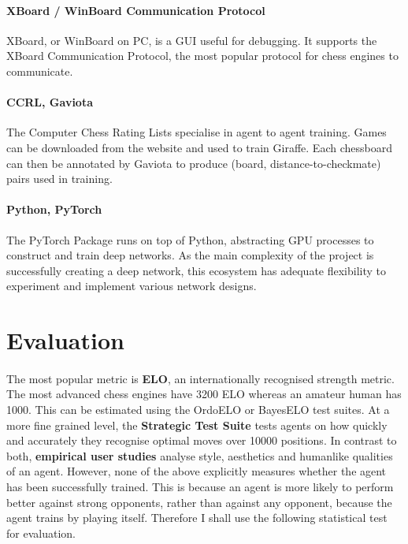 \documentclass[12pt,a4paper]{book}
\begin{document}
\paragraph{XBoard / WinBoard Communication Protocol} XBoard, or WinBoard on PC, is a GUI useful for debugging. It supports the XBoard Communication Protocol, the most popular protocol for chess engines to communicate.

\paragraph{CCRL, Gaviota} The Computer Chess Rating Lists specialise in agent to agent training. Games can be downloaded from the website and used to train Giraffe. Each chessboard can then be annotated by Gaviota to produce (board, distance-to-checkmate) pairs used in training. \cite{gaviota} \cite{giraffe}

\paragraph{Python, PyTorch} The PyTorch Package runs on top of Python, abstracting GPU processes to construct and train deep networks. As the main complexity of the project is successfully creating a deep network, this ecosystem has adequate flexibility to experiment and implement various network designs. \cite{PyTorch} 


\section*{Evaluation}

\paragraph{} The most popular metric is \textbf{ELO}, an internationally recognised strength metric. The most advanced chess engines have 3200 ELO whereas an amateur human has 1000. \cite{giraffe} This can be estimated using the OrdoELO or BayesELO test suites. At a more fine grained level, the \textbf{Strategic Test Suite} tests agents on how quickly and accurately they recognise optimal moves over 10000 positions. \cite{sts} In contrast to both, \textbf{empirical user studies} analyse style, aesthetics and humanlike qualities of an agent. However, none of the above explicitly measures whether the agent has been successfully trained. This is because an agent is more likely to perform better against strong opponents, rather than against any opponent, because the agent trains by playing itself. Therefore I shall use the following statistical test for evaluation.
\end{document}
